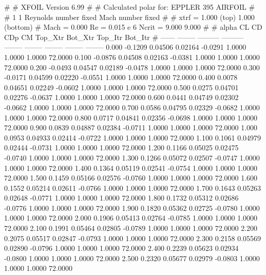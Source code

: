 #  
#       XFOIL         Version 6.99
#  
# Calculated polar for: EPPLER 395 AIRFOIL                              
#  
# 1 1 Reynolds number fixed          Mach number fixed         
#  
# xtrf =   1.000 (top)        1.000 (bottom)  
# Mach =   0.000     Re =     0.015 e 6     Ncrit =   9.000  9.000
#  
#   alpha    CL        CD       CDp       CM     Top_Xtr  Bot_Xtr  Top_Itr  Bot_Itr
#  ------ -------- --------- --------- -------- -------- -------- -------- --------
   0.000  -0.1209   0.04506   0.02164  -0.0291   1.0000   1.0000   1.0000  72.0000
   0.100  -0.0876   0.04508   0.02163  -0.0381   1.0000   1.0000   1.0000  72.0000
   0.200  -0.0493   0.04547   0.02189  -0.0478   1.0000   1.0000   1.0000  72.0000
   0.300  -0.0171   0.04599   0.02220  -0.0551   1.0000   1.0000   1.0000  72.0000
   0.400   0.0078   0.04651   0.02249  -0.0602   1.0000   1.0000   1.0000  72.0000
   0.500   0.0275   0.04701   0.02276  -0.0637   1.0000   1.0000   1.0000  72.0000
   0.600   0.0441   0.04749   0.02302  -0.0662   1.0000   1.0000   1.0000  72.0000
   0.700   0.0586   0.04795   0.02329  -0.0682   1.0000   1.0000   1.0000  72.0000
   0.800   0.0717   0.04841   0.02356  -0.0698   1.0000   1.0000   1.0000  72.0000
   0.900   0.0839   0.04887   0.02384  -0.0711   1.0000   1.0000   1.0000  72.0000
   1.000   0.0953   0.04933   0.02414  -0.0722   1.0000   1.0000   1.0000  72.0000
   1.100   0.1061   0.04979   0.02444  -0.0731   1.0000   1.0000   1.0000  72.0000
   1.200   0.1166   0.05025   0.02475  -0.0740   1.0000   1.0000   1.0000  72.0000
   1.300   0.1266   0.05072   0.02507  -0.0747   1.0000   1.0000   1.0000  72.0000
   1.400   0.1364   0.05119   0.02541  -0.0754   1.0000   1.0000   1.0000  72.0000
   1.500   0.1459   0.05166   0.02576  -0.0760   1.0000   1.0000   1.0000  72.0000
   1.600   0.1552   0.05214   0.02611  -0.0766   1.0000   1.0000   1.0000  72.0000
   1.700   0.1643   0.05263   0.02648  -0.0771   1.0000   1.0000   1.0000  72.0000
   1.800   0.1732   0.05312   0.02686  -0.0776   1.0000   1.0000   1.0000  72.0000
   1.900   0.1820   0.05362   0.02725  -0.0780   1.0000   1.0000   1.0000  72.0000
   2.000   0.1906   0.05413   0.02764  -0.0785   1.0000   1.0000   1.0000  72.0000
   2.100   0.1991   0.05464   0.02805  -0.0789   1.0000   1.0000   1.0000  72.0000
   2.200   0.2075   0.05517   0.02847  -0.0793   1.0000   1.0000   1.0000  72.0000
   2.300   0.2158   0.05569   0.02890  -0.0796   1.0000   1.0000   1.0000  72.0000
   2.400   0.2239   0.05623   0.02934  -0.0800   1.0000   1.0000   1.0000  72.0000
   2.500   0.2320   0.05677   0.02979  -0.0803   1.0000   1.0000   1.0000  72.0000
